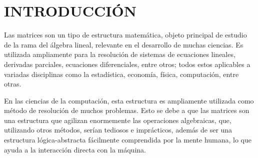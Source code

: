 \documentclass[11pt, twocolumn]{llncs}
\begin{document}

\section{INTRODUCCIÓN}
Las matrices son un tipo de estructura matemática, objeto principal de estudio de la rama del álgebra lineal, relevante en el desarrollo de muchas ciencias. Es utilizada ampliamente para la resolución de sistemas de ecuaciones lineales, derivadas parciales, ecuaciones diferenciales, entre otros; todos estos aplicables a variadas disciplinas como la estadística, economía, física, computación, entre otras.

En las ciencias de la computación, esta estructura es ampliamente utilizada como método de resolución de muchos problemas. Esto se debe a que las matrices son una estructura que agilizan enormemente las operaciones algebraicas, que, utilizando otros métodos, serían tediosos e imprácticos, además de ser una estructura lógica-abstracta fácilmente comprendida por la mente humana, lo que ayuda a la interacción directa con la máquina.
\end{document}
